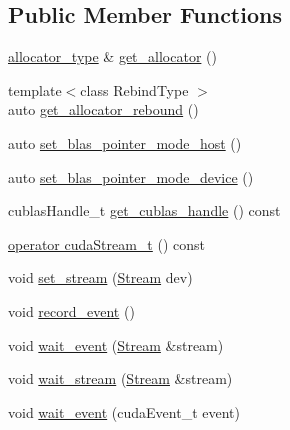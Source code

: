 \subsection*{Public Member Functions}
\begin{DoxyCompactItemize}
\item 
\hyperlink{classbc_1_1streams_1_1Stream_3_01device__tag_01_4_ad6e752fa317da0549e72b1d5118887ee}{allocator\+\_\+type} \& \hyperlink{classbc_1_1streams_1_1Stream_3_01device__tag_01_4_adbe0962ec7ea1cf8b5fb335dc2a76480}{get\+\_\+allocator} ()
\item 
{\footnotesize template$<$class Rebind\+Type $>$ }\\auto \hyperlink{classbc_1_1streams_1_1Stream_3_01device__tag_01_4_a0fc407f470b3852a202bccc90704e0d2}{get\+\_\+allocator\+\_\+rebound} ()
\item 
auto \hyperlink{classbc_1_1streams_1_1Stream_3_01device__tag_01_4_ac7fd6cd1f5b80d582799dc334bb2cf6d}{set\+\_\+blas\+\_\+pointer\+\_\+mode\+\_\+host} ()
\item 
auto \hyperlink{classbc_1_1streams_1_1Stream_3_01device__tag_01_4_a3b36054fc729c84bacc6db1e3c88dde5}{set\+\_\+blas\+\_\+pointer\+\_\+mode\+\_\+device} ()
\item 
cublas\+Handle\+\_\+t \hyperlink{classbc_1_1streams_1_1Stream_3_01device__tag_01_4_abad1bfebb6aceb6dbbc8742c4c0fb891}{get\+\_\+cublas\+\_\+handle} () const
\item 
\hyperlink{classbc_1_1streams_1_1Stream_3_01device__tag_01_4_a161ebe574d652fb8c0836866b1f0c127}{operator cuda\+Stream\+\_\+t} () const
\item 
void \hyperlink{classbc_1_1streams_1_1Stream_3_01device__tag_01_4_a36c32c96ed807fd40421d8437e1919f4}{set\+\_\+stream} (\hyperlink{classbc_1_1streams_1_1Stream}{Stream} dev)
\item 
void \hyperlink{classbc_1_1streams_1_1Stream_3_01device__tag_01_4_ace2a13dccd1c778b669d1de1a4a8a040}{record\+\_\+event} ()
\item 
void \hyperlink{classbc_1_1streams_1_1Stream_3_01device__tag_01_4_a47262ffd70637e5ed8efcde04cffc27b}{wait\+\_\+event} (\hyperlink{classbc_1_1streams_1_1Stream}{Stream} \&stream)
\item 
void \hyperlink{classbc_1_1streams_1_1Stream_3_01device__tag_01_4_aa9fc028f6213e1d90ed9b464400f1551}{wait\+\_\+stream} (\hyperlink{classbc_1_1streams_1_1Stream}{Stream} \&stream)
\item 
void \hyperlink{classbc_1_1streams_1_1Stream_3_01device__tag_01_4_a3a96fec6eefed73405080be57b386d51}{wait\+\_\+event} (cuda\+Event\+\_\+t event)

\end{DoxyCompactItemize}
